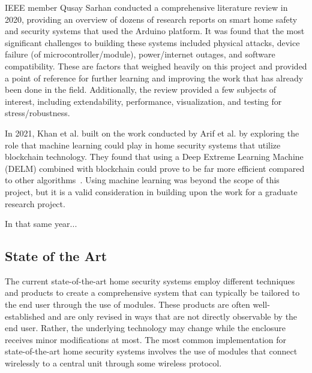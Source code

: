 IEEE member Qusay Sarhan conducted a comprehensive literature review in 2020, providing an
overview of dozens of research reports on smart home safety and security systems that
used the Arduino platform. It was found that the most significant challenges to building
these systems included physical attacks, device failure (of microcontroller/module),
power/internet outages, and software compatibility. These are factors that
weighed heavily on this project and provided a point of reference for further learning
and improving the work that has already been done in the field.
Additionally, the review provided a few subjects of interest, including extendability,
performance, visualization, and testing for stress/robustness. \cite{sarhan2020}

In 2021, Khan et al. built on the work conducted by Arif et al. by exploring the role that
machine learning could play in home security systems that utilize blockchain technology. They
found that using a Deep Extreme Learning Machine (DELM) combined with blockchain could prove
to be far more efficient compared to other algorithms~\cite{khanEtAl2021}. Using machine
learning was beyond the scope of this project, but it is a valid consideration in building
upon the work for a graduate research project.

In that same year...






\subsection{State of the Art}\label{subsec:state-of-the-art}

The current state-of-the-art home security systems employ different techniques and products
to create a comprehensive system that can typically be tailored to the end user through the
use of modules. These products are often well-established and are only revised in ways that
are not directly observable by the end user. Rather, the underlying technology may change
while the enclosure receives minor modifications at most. \cite{sarhan2020} The most common
implementation for state-of-the-art home security systems involves the use of modules that
connect wirelessly to a central unit through some wireless protocol. \cite{joseMalekian2017}

